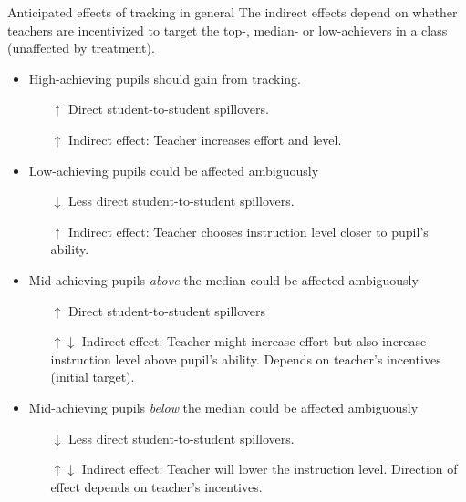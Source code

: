 \documentclass[9pt]{beamer}
\numberwithin{equation}{section}
\begin{document}
\begin{frame}{Anticipated effects of tracking in general}
  The indirect effects depend on whether teachers are incentivized to target the top-, median- or low-achievers in a class (unaffected by treatment).
  \begin{itemize}
    \item High-achieving pupils should gain from tracking.
    \begin{itemize}
      \item[$\uparrow$] Direct student-to-student spillovers.
      \item[$\uparrow$] Indirect effect: Teacher increases effort and level.
    \end{itemize}
    \item Low-achieving pupils could be affected ambiguously
    \begin{itemize}
      \item[$\downarrow$] Less direct student-to-student spillovers.
      \item[$\uparrow$] Indirect effect: Teacher chooses instruction level closer to pupil's ability.
    \end{itemize}
    \item Mid-achieving pupils \textit{above} the median could be affected ambiguously
    \begin{itemize}
      \item[$\uparrow$] Direct student-to-student spillovers
      \item[$\uparrow \downarrow$] Indirect effect: Teacher might increase effort but also increase instruction level above pupil's ability. Depends on teacher's incentives (initial target).
    \end{itemize}
    \item Mid-achieving pupils \textit{below} the median could be affected ambiguously
    \begin{itemize}
      \item[$\downarrow$] Less direct student-to-student spillovers.
      \item[$\uparrow \downarrow$] Indirect effect: Teacher will lower the instruction level. Direction of effect depends on teacher's incentives.
    \end{itemize}
  \end{itemize}
\end{frame}
\end{document}
